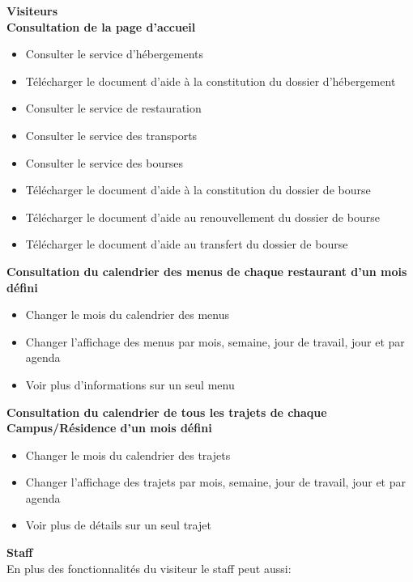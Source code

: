     \textbf{Visiteurs\\}
        \textbf{Consultation de la page d’accueil}
        \begin{itemize}
            \item Consulter le service d'hébergements
            \item Télécharger le document d'aide à la constitution du dossier d'hébergement
            \item Consulter le service de restauration
            \item Consulter le service des transports
            \item Consulter le service des bourses
            \item Télécharger le document d'aide à la constitution du dossier de bourse
            \item Télécharger le document d'aide au renouvellement du dossier de bourse
            \item Télécharger le document d'aide au transfert du dossier de bourse\\
        \end{itemize}

        \textbf{Consultation du calendrier des menus de chaque restaurant d'un mois défini}
        \begin{itemize}
            \item Changer le mois du calendrier des menus
            \item Changer l'affichage des menus par mois, semaine, jour de travail, jour et par agenda
            \item Voir plus d'informations sur un seul menu\\
        \end{itemize} 
        
        \textbf{Consultation du calendrier de tous les trajets de chaque Campus/Résidence d'un mois défini}
        \begin{itemize}
            \item Changer le mois du calendrier des trajets
            \item Changer l’affichage des trajets par mois, semaine, jour de travail, jour et par agenda
            \item Voir plus de détails sur un seul trajet \\
        \end{itemize}

\textbf{Staff\\}
En plus des fonctionnalités du visiteur le staff peut aussi:\\

